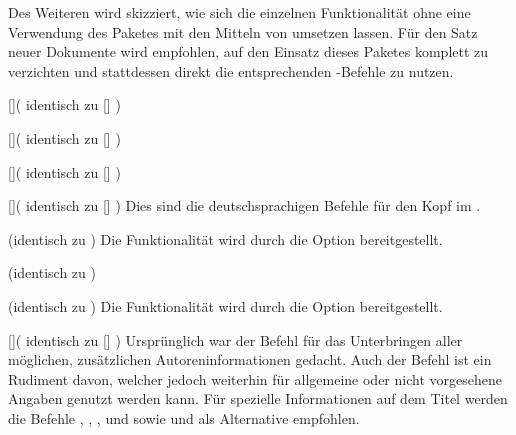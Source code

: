 \begin{Bundle*}{}
Des Weiteren wird skizziert, wie sich die einzelnen Funktionalität ohne eine 
Verwendung des Paketes  mit den Mitteln von \TUDScript 
umsetzen lassen. Für den Satz neuer Dokumente wird empfohlen, auf den Einsatz 
dieses Paketes komplett zu verzichten und stattdessen direkt die entsprechenden 
\TUDScript-Befehle zu nutzen.

\begin{Declaration}{[]}(%
  identisch zu []%
)
\begin{Declaration}{[]}(%
  identisch zu []%
)
\begin{Declaration}{[]}(%
  identisch zu []%
)
\begin{Declaration}{[]}(%
  identisch zu []%
)
\printdeclarationlist%
%
Dies sind die deutschsprachigen Befehle für den Kopf im \CD.
\end{Declaration}
\end{Declaration}
\end{Declaration}
\end{Declaration}

\begin{Declaration}{}(identisch zu )
\printdeclarationlist%
%
Die Funktionalität wird durch die Option  bereitgestellt.
\end{Declaration}

\begin{Declaration}{}(identisch zu )
\begin{Declaration}{}(identisch zu )
\printdeclarationlist%
%
Die Funktionalität wird durch die Option  bereitgestellt.
\end{Declaration}
\end{Declaration}

\begin{Declaration}{[]}(%
  identisch zu []%
)
\printdeclarationlist%
%
Ursprünglich war der Befehl für das Unterbringen aller möglichen, zusätzlichen 
Autoreninformationen gedacht. Auch der Befehl  ist ein 
Rudiment davon, welcher jedoch weiterhin für allgemeine oder nicht vorgesehene 
Angaben genutzt werden kann. Für spezielle Informationen auf dem Titel werden 
die Befehle , , , 
 und  sowie 
 und  als Alternative empfohlen.
\end{Declaration}


\end{Bundle*}
